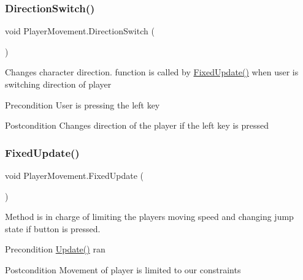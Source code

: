 \subsubsection{\texorpdfstring{Direction\+Switch()}{DirectionSwitch()}}
{\footnotesize\ttfamily void Player\+Movement.\+Direction\+Switch (\begin{DoxyParamCaption}{ }\end{DoxyParamCaption})\hspace{0.3cm}{\ttfamily [inline]}}

Changes character direction. function is called by \mbox{\hyperlink{class_player_movement_a0caaa871b9ef680c9f02bd0e22c77db1}{Fixed\+Update()}} when user is switching direction of player \begin{DoxyPrecond}{Precondition}
User is pressing the left key 
\end{DoxyPrecond}
\begin{DoxyPostcond}{Postcondition}
Changes direction of the player if the left key is pressed 
\end{DoxyPostcond}
\mbox{\label{class_player_movement_a0caaa871b9ef680c9f02bd0e22c77db1}} 
\subsubsection{\texorpdfstring{Fixed\+Update()}{FixedUpdate()}}
{\footnotesize\ttfamily void Player\+Movement.\+Fixed\+Update (\begin{DoxyParamCaption}{ }\end{DoxyParamCaption})\hspace{0.3cm}{\ttfamily [inline]}}

Method is in charge of limiting the players moving speed and changing jump state if button is pressed. \begin{DoxyPrecond}{Precondition}
\mbox{\hyperlink{class_player_movement_aaf9b77d7177d538be9c1447d08191322}{Update()}} ran 
\end{DoxyPrecond}
\begin{DoxyPostcond}{Postcondition}
Movement of player is limited to our constraints 
\end{DoxyPostcond}
\mbox{\label{class_player_movement_abf3660ca2b1a352b4a9da98437c61aa3}} 
